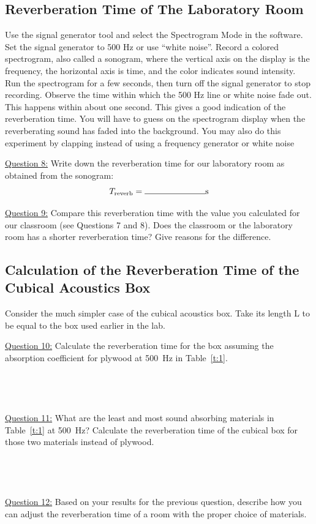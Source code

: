 \documentclass[11pt]{NSF}
\begin{document}
\subsection{Reverberation Time of The Laboratory Room}

Use the signal generator tool and select the Spectrogram Mode in the software. Set the signal
generator to 500 Hz or use “white noise”. Record a colored spectrogram, also called a sonogram,
where the vertical axis on the display is the frequency, the horizontal axis is time, and the color
indicates sound intensity. Run the spectrogram for a few seconds, then turn off the signal
generator to stop recording. Observe the time within which the 500 Hz line or white noise fade
out. This happens within about one second. This gives a good indication of the reverberation
time. You will have to guess on the spectrogram display when the reverberating sound has faded
into the background. You may also do this experiment by clapping instead of using a frequency
generator or white noise

\underline{Question 8:} Write down the reverberation time for our laboratory room as obtained from the sonogram:
\[T_{\rm reverb} = \rule{2.5cm}{0.15mm}{\rm s}\]

\underline{Question 9:} Compare this reverberation time with the value you calculated for our classroom (see
Questions 7 and 8). Does the classroom or the laboratory room has a shorter reverberation time?
Give reasons for the difference.



\subsection{Calculation of the Reverberation Time of the
Cubical Acoustics Box}

Consider the much simpler case of the cubical acoustics box. 
Take its length L to be equal to the box used earlier in the lab.


\underline{Question 10:} Calculate the reverberation time for the box 
assuming the absorption coefficient for plywood at 500~Hz 
in Table~\ref{t:1}.
\\
\\
\\
\\
\\

\underline{Question 11:} What are the least and most sound absorbing materials in 
Table~\ref{t:1} at 500~Hz?
Calculate the reverberation time of the cubical box for 
those two materials instead of plywood.
\\
\\
\\
\\
\\

\underline{Question 12:} Based on your results for the previous question, describe how you
can adjust the reverberation time of a room with the proper choice
of materials.
\\
\\
\\
\\
\\
\end{document}
